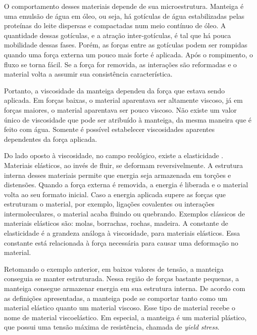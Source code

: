 		O comportamento desses materiais depende de sua microestrutura. Manteiga é uma emulsão de água em óleo, ou seja, há gotículas de água estabilizadas pelas proteínas do leite dispersas e compactadas num meio contínuo de óleo. A quantidade dessas gotículas, e a atração inter-gotículas, é tal que há pouca mobilidade dessas fases.\cite{Hoffmann2014a} Porém, as forças entre as gotículas podem ser rompidas quando uma força externa um pouco mais forte é aplicada. Após o rompimento, o fluxo se torna fácil. Se a força for removida, as interações são reformadas e o material volta a assumir sua consistência característica.
		
		Portanto, a viscosidade da manteiga dependeu da força que estava sendo aplicada. Em forças baixas, o material aparentava ser altamente viscoso, já em forças maiores, o material aparentava ser pouco viscoso. Não existe um valor único de viscosidade que pode ser atribuído à manteiga, da mesma maneira que é feito com água. Somente é possível estabelecer viscosidades aparentes dependentes da força aplicada.\cite{Kronberg2014a}
		
		Do lado oposto à viscosidade, no campo reológico, existe a elasticidade . Materiais elásticos, ao invés de fluir, se deformam reversivelmente. A estrutura interna desses materiais permite que energia seja armazenada em torções e distensões. Quando a força externa é removida, a energia é liberada e o material volta ao seu formato inicial. Caso a energia aplicada supere as forças que estruturam o material, por exemplo, ligações covalentes ou interações intermoleculares, o material acaba fluindo ou quebrando.\cite{Goodwin2008} Exemplos clássicos de materiais elásticos são: molas, borrachas, rochas, madeira. A constante de elasticidade é a grandeza análoga à viscosidade, para materiais elásticos. Essa constante está relacionada à força necessária para causar uma deformação no material. 

		Retomando o exemplo anterior, em baixos valores de tensão, a manteiga conseguia se manter estruturada. Nessa região de forças bastante pequenas, a manteiga consegue armazenar energia em sua estrutura interna. De acordo com as definições apresentadas, a manteiga pode se comportar tanto como um material elástico quanto um material viscoso. Esse tipo de material recebe o nome de material viscoelástico. Em especial, a manteiga é um material plástico, que possui uma tensão máxima de resistência, chamada de \emph{yield stress}.
		

